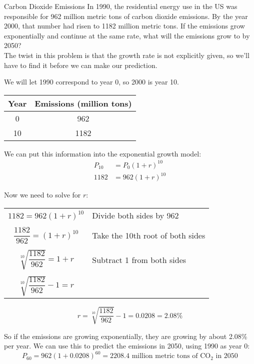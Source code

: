 \begin{example}[https://www.youtube.com/watch?v=2wtJ_T3_e7o]{Carbon Dioxide Emissions}
In 1990, the residential energy use in the US was responsible for 962 million metric tons of carbon dioxide emissions.  By the year 2000, that number had risen to 1182 million metric tons.  If the emissions grow exponentially and continue at the same rate, what will the emissions grow to by 2050?\\

The twist in this problem is that the growth rate is not explicitly given, so we'll have to find it before we can make our prediction.

We will let 1990 correspond to year 0, so 2000 is year 10.
\begin{center}
\begin{tabular}{c c}
\textbf{Year} & \textbf{Emissions (million tons)}\\
\hline
0 & 962\\
10 & 1182
\end{tabular}
\end{center}
We can put this information into the exponential growth model:
\begin{align*}
P_{10} &= P_0(1+r)^{10}\\
1182 &= 962(1+r)^{10}
\end{align*}

Now we need to solve for $r$:
\begin{center}
\begin{tabular}{c l}
$1182 = 962(1+r)^{10}$ & Divide both sides by 962\\
& \\
$\dfrac{1182}{962} = (1+r)^{10}$ & Take the 10th root of both sides\\
& \\
$\sqrt[10]{\dfrac{1182}{962}} = 1+r$ & Subtract 1 from both sides\\
& \\
$\sqrt[10]{\dfrac{1182}{962}}-1 = r$ &
\end{tabular}
\end{center}
\[r=\sqrt[10]{\dfrac{1182}{962}}-1 = 0.0208 = 2.08\%\]

So if the emissions are growing exponentially, they are growing by about 2.08\% per year.  We can use this to predict the emissions in 2050, using 1990 as year 0:
\[P_{60} = 962(1+0.0208)^{60} = 2208.4 \textrm{ million metric tons of CO}_2 \textrm{ in 2050}\]
\end{example}

